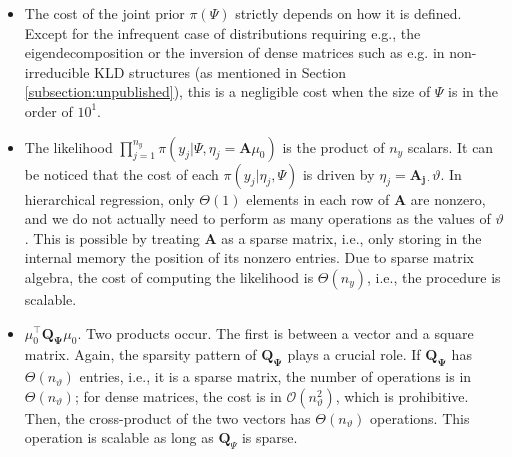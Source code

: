 \documentclass[openany, 11pt, oneside]{book}
\begin{document}
\begin{itemize}
\item The cost of the joint prior $\pi(\Psi)$ strictly depends on how it is defined. Except for the infrequent case of distributions requiring e.g., the eigendecomposition or the inversion of dense matrices such as e.g. in non-irreducible KLD structures (as mentioned in Section \ref{subsection:unpublished}), this is a negligible cost when the size of $\Psi$ is in the order of $10^1$.
\item The likelihood $\prod_{j=1}^{n_y} \pi \left( y_j \vert\Psi,  \eta_j=\boldsymbol{A}\mu_0\right)$ is the product of $n_y$ scalars. It can be noticed that the cost of each $\pi(y_j \vert \eta_j, \Psi)$ is driven by $\eta_j = \boldsymbol{A_{j\cdot}} \vartheta$. In hierarchical regression, only $ {\Theta}(1)$ elements in each row of $\boldsymbol{A}$ are nonzero, and we do not actually need to perform as many operations as the values of $\vartheta$. This is possible by treating $\boldsymbol{A}$ as a sparse matrix, i.e., only storing in the internal memory the position of its nonzero entries. Due to sparse matrix algebra, the cost of computing the likelihood is $ {\Theta}(n_y)$, i.e., the procedure is scalable.
\item $\mu_0^\top \boldsymbol{Q_\Psi} \mu_0$. Two products occur. The first is between a vector and a square matrix. Again, the sparsity pattern of $\boldsymbol{Q_\Psi}$ plays a crucial role. If $\boldsymbol{Q_\Psi}$ has $\Theta(n_\vartheta)$ entries, i.e., it is a sparse matrix, the number of operations is in $\Theta(n_\vartheta)$; for dense matrices, the cost is in $\mathcal{O}(n_\vartheta^2)$, which is prohibitive. Then, the cross-product of the two vectors has $\Theta(n_\vartheta)$ operations. This operation is scalable as long as $\boldsymbol{Q}_\Psi$ is sparse.

\end{itemize}
\end{document}

